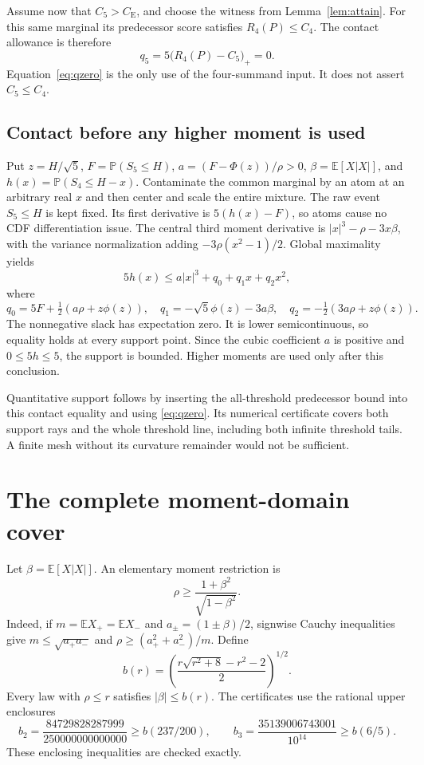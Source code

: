 \documentclass[11pt,a4paper]{article}
\theoremstyle{definition}
\newcommand{\E}{\mathbb E}
\newcommand{\Pp}{\mathbb P}
\newcommand{\CE}{C_{\mathrm E}}
\begin{document}
Assume now that $C_5>\CE$, and choose the witness from Lemma~\ref{lem:attain}.
For this same marginal its predecessor score satisfies $R_4(P)\le C_4$.
The contact allowance is therefore
\begin{equation}\label{eq:qzero}
 q_5=5\bigl(R_4(P)-C_5\bigr)_+=0.
\end{equation}
Equation~\eqref{eq:qzero} is the only use of the four-summand input.
It does not assert $C_5\le C_4$.

\subsection{Contact before any higher moment is used}
Put $z=H/\sqrt5$, $F=\Pp(S_5\le H)$, $a=(F-\Phi(z))/\rho>0$,
$\beta=\E[X|X|]$, and $h(x)=\Pp(S_4\le H-x)$.
Contaminate the common marginal by an atom at an arbitrary real $x$ and
then center and scale the entire mixture. The raw event $S_5\le H$ is
kept fixed. Its first derivative is $5(h(x)-F)$, so atoms cause no CDF
differentiation issue. The central third moment derivative is
$|x|^3-\rho-3x\beta$, with the variance normalization adding
$-3\rho(x^2-1)/2$. Global maximality yields
\begin{equation}\label{eq:contact}
 5h(x)\le a|x|^3+q_0+q_1x+q_2x^2,
\end{equation}
where
\[
 q_0=5F+\tfrac12(a\rho+z\phi(z)),\quad
 q_1=-\sqrt5\phi(z)-3a\beta,\quad
 q_2=-\tfrac12(3a\rho+z\phi(z)).
\]
The nonnegative slack has expectation zero. It is lower semicontinuous,
so equality holds at every support point. Since the cubic coefficient
$a$ is positive and $0\le5h\le5$, the support is bounded. Higher moments
are used only after this conclusion.

Quantitative support follows by inserting the all-threshold predecessor
bound into this contact equality and using \eqref{eq:qzero}. Its numerical
certificate covers both support rays and the whole threshold line,
including both infinite threshold tails. A finite mesh without its
curvature remainder would not be sufficient.

\section{The complete moment-domain cover}\label{sec:cover}
Let $\beta=\E[X|X|]$. An elementary moment restriction is
\begin{equation}\label{eq:beta}
 \rho\ge\frac{1+\beta^2}{\sqrt{1-\beta^2}}.
\end{equation}
Indeed, if $m=\E X_+=\E X_-$ and $a_\pm=(1\pm\beta)/2$, signwise
Cauchy inequalities give $m\le\sqrt{a_+a_-}$ and
$\rho\ge(a_+^2+a_-^2)/m$. Define
\[
 b(r)=\left(\frac{r\sqrt{r^2+8}-r^2-2}{2}\right)^{1/2}.
\]
Every law with $\rho\le r$ satisfies $|\beta|\le b(r)$.
The certificates use the rational upper enclosures
\[
 b_2=\frac{84729828287999}{250000000000000}\ge b(237/200),
 \qquad
 b_3=\frac{35139006743001}{10^{14}}\ge b(6/5).
\]
These enclosing inequalities are checked exactly.
\end{document}
